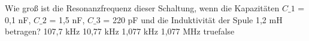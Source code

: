     {Wie groß ist die Resonanzfrequenz dieser Schaltung, wenn die Kapazitäten $C\_1$ = 0,1 nF, $C\_2$ = 1,5 nF, $C\_3$ = 220 pF und die Induktivität der Spule 1,2 mH betragen?}
    {107,7 kHz}
    {10,77 kHz}
    {1,077 kHz}
    {1,077 MHz}
    {true}{false}